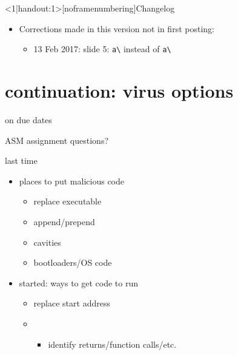 \begin{frame}
    \titlepage
\end{frame}

{
\begin{frame}<1|handout:1>[noframenumbering]{Changelog}
    \begin{itemize}
        \item Corrections made in this version not in first posting:
        \begin{itemize}
        \item 13 Feb 2017: slide 5: {\tt a\textbackslash*} instead of {\tt a\textbackslash}
        \end{itemize}
    \end{itemize}
\end{frame}
}

\section{continuation: virus options}

\begin{frame}{on due dates}
\end{frame}

\begin{frame}{ASM assignment questions?}
\end{frame}

\begin{frame}{last time}
    \begin{itemize}
    \item places to put malicious code
        \begin{itemize}
        \item replace executable
        \item append/prepend
        \item cavities
        \item bootloaders/OS code
        \end{itemize}
    \item started: ways to get code to run
        \begin{itemize}
        \item replace start address
        \item {}
            \begin{itemize}
            \item identify returns/function calls/etc.
            \end{itemize}
        \end{itemize}
    \end{itemize}
\end{frame}

